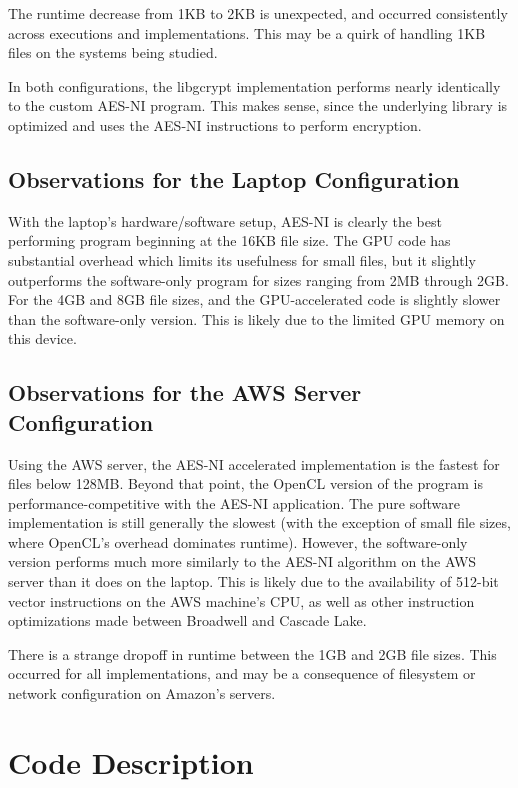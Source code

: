 \documentclass[a4paper,10pt]{article}
\begin{document}
The runtime decrease from 1KB to 2KB is unexpected, and occurred consistently across executions and implementations.  This may be a quirk of handling 1KB files on the systems being studied.

In both configurations, the libgcrypt implementation performs nearly identically to the custom AES-NI program.  This makes sense, since the underlying library is optimized and uses the AES-NI instructions to perform encryption.

\subsection{Observations for the Laptop Configuration}

With the laptop's hardware/software setup, AES-NI is clearly the best performing program beginning at the 16KB  file size.  The GPU code has substantial overhead which limits its usefulness for small files, but it slightly outperforms the software-only program for sizes ranging from 2MB through 2GB. For the 4GB and 8GB file sizes, and the GPU-accelerated code is slightly slower than the software-only version.  This is likely due to the limited GPU memory on this device.

\subsection{Observations for the AWS Server Configuration}

Using the AWS server, the AES-NI accelerated implementation is the fastest for files below 128MB.  Beyond that point, the OpenCL version of the program is performance-competitive with the AES-NI application.  The pure software implementation is still generally the slowest (with the exception of small file sizes, where OpenCL's overhead dominates runtime).  However, the software-only version performs much more similarly to the AES-NI algorithm on the AWS server than it does on the laptop.  This is likely due to the availability of 512-bit vector instructions on the AWS machine's CPU, as well as other instruction optimizations made between Broadwell and Cascade Lake.

There is a strange dropoff in runtime between the 1GB and 2GB file sizes.  This occurred for all implementations, and may be a consequence of filesystem or network configuration on Amazon's servers.


\section{Code Description}
\end{document}
